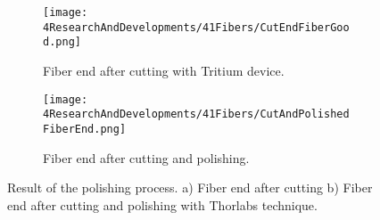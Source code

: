 \begin{figure}
\centering
    \begin{subfigure}[b]{0.5\textwidth}
    \centering
    \texttt{[image: 4ResearchAndDevelopments/41Fibers/CutEndFiberGood.png]}  
    \caption{Fiber end after cutting with Tritium device.\label{subfig:CutFiberEnd}}
    \end{subfigure}
    \hfill
    \begin{subfigure}[b]{0.45\textwidth}
    \centering
    \texttt{[image: 4ResearchAndDevelopments/41Fibers/CutAndPolishedFiberEnd.png]}  
    \caption{Fiber end after cutting and polishing.\label{subfig:PolishFiberEnd}}
    \end{subfigure}
 \caption{Result of the polishing process. a) Fiber end after cutting b) Fiber end after cutting and polishing with Thorlabs technique.}
 \label{fig:ResultofPolishingProcess}
\end{figure}